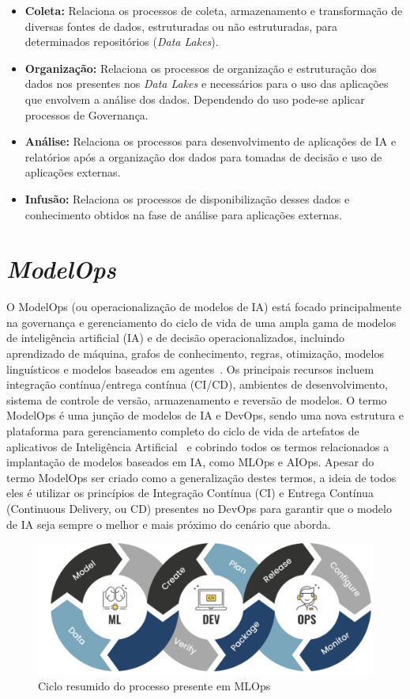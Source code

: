 \documentclass[portugues]{ic-tese}
\begin{document}
\begin{itemize}
\item \textbf{Coleta:} Relaciona os processos de coleta, armazenamento e transformação de diversas fontes de dados, estruturadas ou não estruturadas, para determinados repositórios (\textit{Data Lakes}).
\item \textbf{Organização:} Relaciona os processos de organização e estruturação dos dados nos presentes nos \textit{Data Lakes} e necessários para o uso das aplicações que envolvem a análise dos dados. Dependendo do uso pode-se aplicar processos de Governança.
\item \textbf{Análise:} Relaciona os processos para desenvolvimento de aplicações de IA e relatórios após a organização dos dados para tomadas de decisão e uso de aplicações externas.
\item \textbf{Infusão:} Relaciona os processos de disponibilização desses dados e conhecimento obtidos na fase de análise para aplicações externas.
\end{itemize}

\section{\textit{ModelOps}}
\label{app:ModelOps}

O ModelOps (ou operacionalização de modelos de IA) está focado principalmente na governança e gerenciamento do ciclo de vida de uma ampla gama de modelos de inteligência artificial (IA) e de decisão operacionalizados, incluindo aprendizado de máquina, grafos de conhecimento, regras, otimização, modelos linguísticos e modelos baseados em agentes~\cite{Gartner_2022}. Os principais recursos incluem integração contínua/entrega contínua (CI/CD), ambientes de desenvolvimento, sistema de controle de versão, armazenamento e reversão de modelos. O termo ModelOps é uma junção de modelos de IA e DevOps, sendo uma nova estrutura e plataforma para gerenciamento completo do ciclo de vida de artefatos de aplicativos de Inteligência Artificial~\cite{Hummer_2019} e cobrindo todos os termos relacionados a implantação de modelos baseados em IA, como MLOps e AIOps. Apesar do termo ModelOps ser criado como a generalização destes termos, a ideia de todos eles é utilizar os princípios de Integração Contínua (CI) e Entrega Contínua (Continuous Delivery, ou CD) presentes no DevOps para garantir que o modelo de IA seja sempre o melhor e mais próximo do cenário que aborda.

\begin{figure}[H]
\centering
\includegraphics[scale=0.7]{images/code-validate-deploy-loop.png}
\caption {Ciclo resumido do processo presente em MLOps}
\label{fig:MLOpsLoop}
\end{figure}
\end{document}
